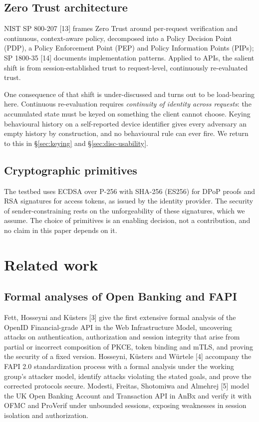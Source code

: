 \subsection{Zero Trust architecture}

NIST SP 800-207 [13] frames Zero Trust around per-request verification and continuous, context-aware policy, decomposed into a Policy Decision Point (PDP), a Policy Enforcement Point (PEP) and Policy Information Points (PIPs); SP 1800-35 [14] documents implementation patterns. Applied to APIs, the salient shift is from session-established trust to request-level, continuously re-evaluated trust.

One consequence of that shift is under-discussed and turns out to be load-bearing here. Continuous re-evaluation requires \textit{continuity of identity across requests}: the accumulated state must be keyed on something the client cannot choose. Keying behavioural history on a self-reported device identifier gives every adversary an empty history by construction, and no behavioural rule can ever fire. We return to this in \S\ref{sec:keying} and \S\ref{sec:disc-usability}.

\subsection{Cryptographic primitives}

The testbed uses ECDSA over P-256 with SHA-256 (ES256) for DPoP proofs and RSA signatures for access tokens, as issued by the identity provider. The security of sender-constraining rests on the unforgeability of these signatures, which we assume. The choice of primitives is an enabling decision, not a contribution, and no claim in this paper depends on it.

\section{Related work}
\label{sec:relwork}

\subsection{Formal analyses of Open Banking and FAPI}

Fett, Hosseyni and K\"usters [3] give the first extensive formal analysis of the OpenID Financial-grade API in the Web Infrastructure Model, uncovering attacks on authentication, authorization and session integrity that arise from partial or incorrect composition of PKCE, token binding and mTLS, and proving the security of a fixed version. Hosseyni, K\"usters and W\"urtele [4] accompany the FAPI 2.0 standardization process with a formal analysis under the working group's attacker model, identify attacks violating the stated goals, and prove the corrected protocols secure. Modesti, Freitas, Shotomiwa and Almehrej [5] model the UK Open Banking Account and Transaction API in AnBx and verify it with OFMC and ProVerif under unbounded sessions, exposing weaknesses in session isolation and authorization.

